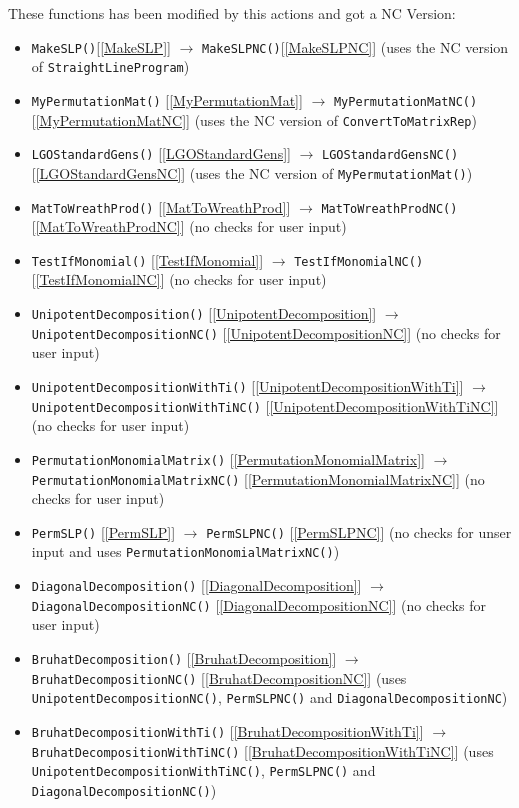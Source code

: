 \documentclass[a4paper,11pt]{report}
\begin{document}
{{ These functions has been modified by this actions and got a NC Version: 
\begin{itemize}
\item \texttt{MakeSLP()}[\ref{MakeSLP}] $\to$ \texttt{MakeSLPNC()}[\ref{MakeSLPNC}] (uses the NC version of \texttt{StraightLineProgram})
\item \texttt{MyPermutationMat()} [\ref{MyPermutationMat}] $\to$ \texttt{MyPermutationMatNC()} [\ref{MyPermutationMatNC}] (uses the NC version of \texttt{ConvertToMatrixRep})
\item \texttt{LGOStandardGens()} [\ref{LGOStandardGens}] $\to$ \texttt{LGOStandardGensNC()} [\ref{LGOStandardGensNC}] (uses the NC version of \texttt{MyPermutationMat()})
\item \texttt{MatToWreathProd()} [\ref{MatToWreathProd}] $\to$ \texttt{MatToWreathProdNC()} [\ref{MatToWreathProdNC}] (no checks for user input)
\item \texttt{TestIfMonomial()} [\ref{TestIfMonomial}] $\to$ \texttt{TestIfMonomialNC()} [\ref{TestIfMonomialNC}] (no checks for user input)
\item \texttt{UnipotentDecomposition()} [\ref{UnipotentDecomposition}] $\to$ \texttt{UnipotentDecompositionNC()} [\ref{UnipotentDecompositionNC}] (no checks for user input)
\item \texttt{UnipotentDecompositionWithTi()} [\ref{UnipotentDecompositionWithTi}] $\to$ \texttt{UnipotentDecompositionWithTiNC()} [\ref{UnipotentDecompositionWithTiNC}] (no checks for user input)
\item \texttt{PermutationMonomialMatrix()} [\ref{PermutationMonomialMatrix}] $\to$ \texttt{PermutationMonomialMatrixNC()} [\ref{PermutationMonomialMatrixNC}] (no checks for user input)
\item \texttt{PermSLP()} [\ref{PermSLP}] $\to$ \texttt{PermSLPNC()} [\ref{PermSLPNC}] (no checks for unser input and uses \texttt{PermutationMonomialMatrixNC()})
\item \texttt{DiagonalDecomposition()} [\ref{DiagonalDecomposition}] $\to$ \texttt{DiagonalDecompositionNC()} [\ref{DiagonalDecompositionNC}] (no checks for user input)
\item \texttt{BruhatDecomposition()} [\ref{BruhatDecomposition}] $\to$ \texttt{BruhatDecompositionNC()} [\ref{BruhatDecompositionNC}] (uses \texttt{UnipotentDecompositionNC()}, \texttt{PermSLPNC()} and \texttt{DiagonalDecompositionNC})
\item \texttt{BruhatDecompositionWithTi()} [\ref{BruhatDecompositionWithTi}] $\to$ \texttt{BruhatDecompositionWithTiNC()} [\ref{BruhatDecompositionWithTiNC}] (uses \texttt{UnipotentDecompositionWithTiNC()}, \texttt{PermSLPNC()} and \texttt{DiagonalDecompositionNC()})
\end{itemize}
 }

}
\end{document}

